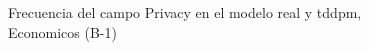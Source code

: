 \begin{figure}[H]
    \centering
    
    \caption{Frecuencia del campo Privacy en el modelo real y tddpm, Economicos (B-1)}
    \label{frecuency-Privacy-tddpm_mlp}
\end{figure}